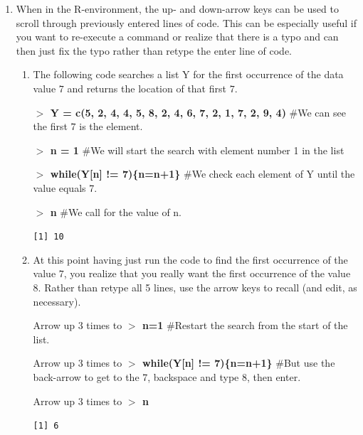 \documentclass{article}
\newcommand{\Rin}[1]{\textbf{$>$ {#1}}}
\newcommand{\Rcom}[1]{\hspace{1cm} \#{#1}}
\newcommand{\Rout}[1]{\texttt{{#1}}}
\begin{document}
\begin{enumerate}
\newpage

\item When in the R-environment, the up- and down-arrow keys can be used to scroll through previously entered lines of code.  This can be especially useful if you want to re-execute a command or realize that there is a typo and can then just fix the typo rather than retype the enter line of code.
	\begin{enumerate}
	\item The following code searches a list Y for the first occurrence of the data value $7$ and returns the location of that first $7$. 
	
	\Rin{Y = c(5, 2, 4, 4, 5, 8, 2, 4, 6, 7, 2, 1, 7, 2, 9, 4)} \Rcom{We can see the first $7$ is the  element.} 
	
	\Rin{n = 1} \Rcom{We will start the search with element number 1 in the list} 
	
	\Rin{while(Y[n] != 7)\{n=n+1\}} \Rcom{We check each element of Y until the value equals 7.} 
	
	\Rin{n} \Rcom{We call for the value of n.} 
	
	\Rout{[1] 10} 
	
	\item At this point having just run the code to find the first occurrence of the value $7$, you realize that you really want the first occurrence of the value $8$.  Rather than retype all 5 lines, use the arrow keys to recall (and edit, as necessary). 
	
	Arrow up 3 times to \Rin{n=1} \Rcom{Restart the search from the start of the list.} 
	
	Arrow up 3 times to \Rin{while(Y[n] != 7)\{n=n+1\}} 
	\Rcom{But use the back-arrow to get to the 7, backspace and type 8, then enter.} 
	
	Arrow up 3 times to \Rin{n} 
	
	\Rout{[1] 6}
	\end{enumerate}
\end{enumerate}
\end{document}
